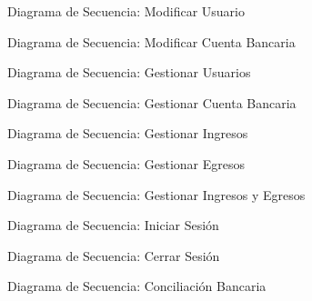\documentclass{article}
\begin{document}
\begin{figure}[H]
    \centering
    \caption{Diagrama de Secuencia: Modificar Usuario}
\end{figure}

\begin{figure}[H]
    \centering
    \caption{Diagrama de Secuencia: Modificar Cuenta Bancaria}
\end{figure}

\begin{figure}[H]
    \centering
    \caption{Diagrama de Secuencia: Gestionar Usuarios}
\end{figure}

\begin{figure}[H]
    \centering
    \caption{Diagrama de Secuencia: Gestionar Cuenta Bancaria}
\end{figure}

\begin{figure}[H]
    \centering
    \caption{Diagrama de Secuencia: Gestionar Ingresos}
\end{figure}

\begin{figure}[H]
    \centering
    \caption{Diagrama de Secuencia: Gestionar Egresos}
\end{figure}

\begin{figure}[H]
    \centering
    \caption{Diagrama de Secuencia: Gestionar Ingresos y Egresos}
\end{figure}

\begin{figure}[H]
    \centering
    \caption{Diagrama de Secuencia: Iniciar Sesión}
\end{figure}

\begin{figure}[H]
    \centering
    \caption{Diagrama de Secuencia: Cerrar Sesión}
\end{figure}

\begin{figure}[H]
    \centering
    \caption{Diagrama de Secuencia: Conciliación Bancaria}
\end{figure}
\end{document}
